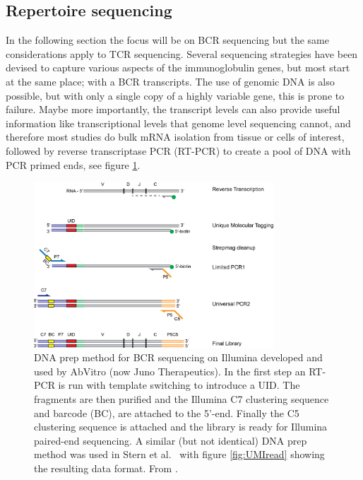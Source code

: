 \subsection{Repertoire sequencing}
In the following section the focus will be on BCR sequencing but the same considerations apply to TCR sequencing.
Several sequencing strategies have been devised to capture various aspects of the immunoglobulin genes, but most start at the same place; with a BCR transcripts.
The use of genomic DNA is also possible, but with only a single copy of a highly variable gene, this is prone to failure.
Maybe more importantly, the transcript levels can also provide useful information like transcriptional levels that genome level sequencing cannot, and therefore most studies do bulk mRNA isolation from tissue or cells of interest, followed by reverse transcriptase PCR (RT-PCR) to create a pool of DNA with PCR primed ends, see figure \ref{fig:BCR_RTPCR}.

\begin{figure}[ht]
    \centering
    \includegraphics[width=0.8\textwidth]{figures/BCR_RTPCR_AbVitro.png}
    \caption{
        \label{fig:BCR_RTPCR}
        DNA prep method for BCR sequencing on Illumina developed and used by AbVitro (now Juno Therapeutics).
        In the first step an RT-PCR is run with template switching to introduce a UID.
        The fragments are then purified and the Illumina C7 clustering sequence and barcode (BC), are attached to the 5'-end.
        Finally the C5 clustering sequence is attached and the library is ready for Illumina paired-end sequencing.
        A similar (but not identical) DNA prep method was used in Stern et al.\ \cite{stern2014b} with figure \ref{fig:UMIread} showing the resulting data format.
        From \cite{laustsen2017exploration}.
    }
\end{figure}

